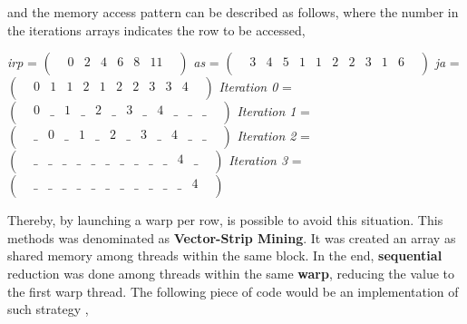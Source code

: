 \documentclass[12pt]{article}
\begin{document}
and the memory access pattern can be described as follows, where the number in the iterations arrays indicates the row to be accessed, 

\begin{center}
\textit{irp}  =   
$
\begin{pmatrix}
    & 0 & 2 & 4 & 6 & 8 & 11 & \\
\end{pmatrix}
$
\linebreak
\textit{as}  =   
$
\begin{pmatrix}
    & 3 & 4 & 5 & 1 & 1 & 2 & 2 & 3 & 1 & 6 & \\
\end{pmatrix}
$
\linebreak
\textit{ja}  =   
$
\begin{pmatrix}
    & 0 & 1 & 1 & 2 & 1 & 2 & 2 & 3 & 3 & 4 & \\
\end{pmatrix}
$
\linebreak
\linebreak
\textit{Iteration 0}  =   
$
\begin{pmatrix}
    & 0 & \_ & 1 & \_ & 2 & \_ & 3 & \_ & 4 & \_ & \_ & \_ &  \\
\end{pmatrix}
$
\linebreak
\textit{Iteration 1}  =   
$
\begin{pmatrix}
    & \_ & 0 & \_ & 1 & \_ & 2 & \_ & 3 & \_ & 4 & \_ & \_ &  \\
\end{pmatrix}
$
\linebreak
\textit{Iteration 2}  =   
$
\begin{pmatrix}
    & \_ & \_ & \_ & \_ & \_ & \_ & \_ & \_ & \_ & \_ & 4 & \_ & \\
\end{pmatrix}
$
\linebreak
\textit{Iteration 3}  =   
$
\begin{pmatrix}
    & \_ & \_ & \_ & \_ & \_ & \_ & \_ & \_ & \_ & \_ & \_ & 4 & \\
\end{pmatrix}
$
\linebreak
\end{center}

 
\par Thereby, by launching a warp per row, is possible to avoid this situation. This methods was denominated as \textbf{Vector-Strip Mining}. It was created an array as shared memory among threads within the same block. In the end, \textbf{sequential} reduction was done among threads within the same \textbf{warp}, reducing the value to the first warp thread. The following piece of code would be an implementation of such strategy \cite{scalar-vm},
\end{document}

